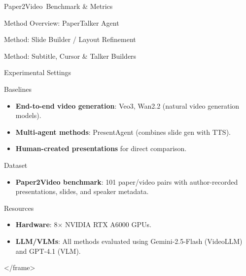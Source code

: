 \documentclass{beamer}
\newcommand{\alertterm}[1]{\alert{\textbf{#1}}}
\newcommand{\bench}{Paper2Video}
\begin{document}
\begin{frame}{\bench~Benchmark \& Metrics}
\begin{frame}{Method Overview: PaperTalker Agent}
\begin{frame}{Method: Slide Builder / Layout Refinement}
\begin{frame}{Method: Subtitle, Cursor \& Talker Builders}
\begin{frame}{Experimental Settings}
  \begin{block}{\small Baselines}
   \footnotesize
    \small
    \begin{itemize}
      \item \alertterm{End-to-end video generation}: Veo3, Wan2.2 (natural video generation models).
      \item \alertterm{Multi-agent methods}: PresentAgent (combines slide gen with TTS).
      \item \alertterm{Human-created presentations} for direct comparison.
    \end{itemize}
  \end{block}
  \vspace{-0.5\baselineskip}
  \begin{block}{\small Dataset}
   \footnotesize
    \small
    \begin{itemize}
      \item \alertterm{Paper2Video benchmark}: 101 paper/video pairs with author-recorded presentations, slides, and speaker metadata.
    \end{itemize}
  \end{block}
  \vspace{-0.5\baselineskip}
  \begin{block}{\small Resources}
   \footnotesize
    \small
    \begin{itemize}
      \item \alertterm{Hardware}: 8$\times$ NVIDIA RTX A6000 GPUs.
      \item \alertterm{LLM/VLMs}: All methods evaluated using Gemini-2.5-Flash (VideoLLM) and GPT-4.1 (VLM).
    \end{itemize}
  \end{block}
</frame>


\end{frame}
\end{frame}
\end{frame}
\end{frame}
\end{frame}
\end{document}
